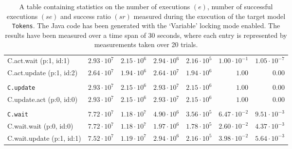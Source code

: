 \begin{table}[htbp]
{\begin{tabular}{lrrrrrr}
\hspace{3mm}C.act.wait (p:1, id:1)    & $2.93 \cdot 10^{7}$ & $2.15 \cdot 10^{6}$ & $2.94 \cdot 10^{6}$ & $2.16 \cdot 10^{5}$ & $1.00 \cdot 10^{-1}$ & $1.05 \cdot 10^{-7}$ \\
\hspace{3mm}C.act.update (p:1, id:2)  & $2.64 \cdot 10^{7}$ & $1.94 \cdot 10^{6}$ & $2.64 \cdot 10^{7}$ & $1.94 \cdot 10^{6}$ &               $1.00$ &               $0.00$ \\
\\[-8pt]\texttt{C.update}             & $2.93 \cdot 10^{7}$ & $2.15 \cdot 10^{6}$ & $2.93 \cdot 10^{7}$ & $2.15 \cdot 10^{6}$ &               $1.00$ &               $0.00$ \\
\hspace{3mm}C.update.act (p:0, id:0)  & $2.93 \cdot 10^{7}$ & $2.15 \cdot 10^{6}$ & $2.93 \cdot 10^{7}$ & $2.15 \cdot 10^{6}$ &               $1.00$ &               $0.00$ \\
\\[-8pt]\texttt{C.wait}               & $7.72 \cdot 10^{7}$ & $1.18 \cdot 10^{7}$ & $4.90 \cdot 10^{6}$ & $3.56 \cdot 10^{5}$ & $6.47 \cdot 10^{-2}$ & $9.51 \cdot 10^{-3}$ \\
\hspace{3mm}C.wait.wait (p:0, id:0)   & $7.72 \cdot 10^{7}$ & $1.18 \cdot 10^{7}$ & $1.97 \cdot 10^{6}$ & $1.78 \cdot 10^{5}$ & $2.60 \cdot 10^{-2}$ & $4.37 \cdot 10^{-3}$ \\
\hspace{3mm}C.wait.update (p:1, id:1) & $7.52 \cdot 10^{7}$ & $1.19 \cdot 10^{7}$ & $2.94 \cdot 10^{6}$ & $2.16 \cdot 10^{5}$ & $3.98 \cdot 10^{-2}$ & $5.64 \cdot 10^{-3}$ \\
\bottomrule
\end{tabular}
}
\caption{A table containing statistics on the number of executions $(e)$, number of successful executions $(se)$ and success ratio $(sr)$ measured during the execution of the target model \texttt{Tokens}. The Java code has been generated with the `Variable' locking mode enabled. The results have been measured over a time span of 30 seconds, where each entry is represented by measurements taken over 20 trials.}
\label{table:frequency_results_tokens_variable}
\end{table}